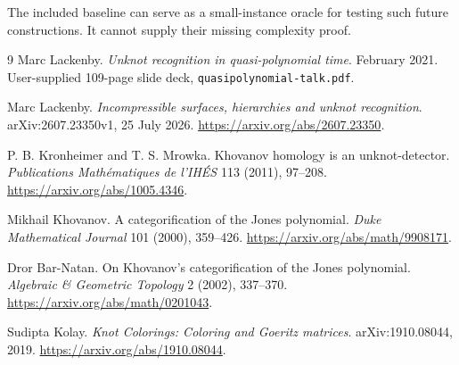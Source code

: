 \documentclass[11pt]{article}
\theoremstyle{definition}
\newcommand{\code}[1]{\texttt{#1}}
\begin{document}
The included baseline can serve as a small-instance oracle for testing such
future constructions. It cannot supply their missing complexity proof.

\begin{thebibliography}{9}
Marc Lackenby.
\emph{Unknot recognition in quasi-polynomial time}.
February 2021. User-supplied 109-page slide deck,
\code{quasipolynomial-talk.pdf}.

Marc Lackenby.
\emph{Incompressible surfaces, hierarchies and unknot recognition}.
arXiv:2607.23350v1, 25 July 2026.
\url{https://arxiv.org/abs/2607.23350}.

P. B. Kronheimer and T. S. Mrowka.
Khovanov homology is an unknot-detector.
\emph{Publications Math\'ematiques de l'IH\'ES} 113 (2011), 97--208.
\url{https://arxiv.org/abs/1005.4346}.

Mikhail Khovanov.
A categorification of the Jones polynomial.
\emph{Duke Mathematical Journal} 101 (2000), 359--426.
\url{https://arxiv.org/abs/math/9908171}.

Dror Bar-Natan.
On Khovanov's categorification of the Jones polynomial.
\emph{Algebraic \& Geometric Topology} 2 (2002), 337--370.
\url{https://arxiv.org/abs/math/0201043}.

Sudipta Kolay.
\emph{Knot Colorings: Coloring and Goeritz matrices}.
arXiv:1910.08044, 2019.
\url{https://arxiv.org/abs/1910.08044}.
\end{thebibliography}
\end{document}
